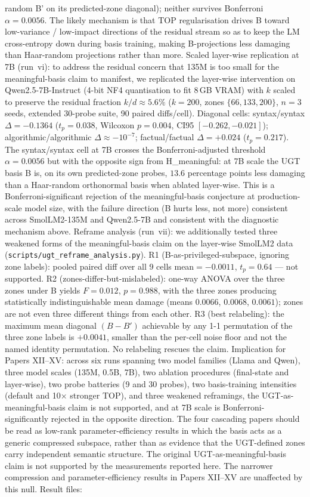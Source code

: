 \documentclass[11pt]{article}
\begin{document}
random B' on its predicted-zone diagonal); neither survives Bonferroni $\alpha{=}0.0056$. The likely mechanism is that TOP regularisation drives B toward low-variance / low-impact directions of the residual stream so as to keep the LM cross-entropy down during basis training, making B-projections less damaging than Haar-random projections rather than more. Scaled layer-wise replication at 7B (run~vi): to address the residual concern that 135M is too small for the meaningful-basis claim to manifest, we replicated the layer-wise intervention on Qwen2.5-7B-Instruct (4-bit NF4 quantisation to fit 8\,GB VRAM) with $k$ scaled to preserve the residual fraction $k/d \approx 5.6\%$ ($k{=}200$, zones $\{66,133,200\}$, $n{=}3$ seeds, extended 30-probe suite, 90 paired diffs/cell). Diagonal cells: syntax/syntax $\Delta{=}{-}0.1364$ ($t_p{=}0.038$, Wilcoxon $p{=}0.004$, CI95 $[-0.262,-0.021]$); algorithmic/algorithmic $\Delta{\approx}{-}10^{-7}$; factual/factual $\Delta{=}{+}0.024$ ($t_p{=}0.217$). The syntax/syntax cell at 7B crosses the Bonferroni-adjusted threshold $\alpha{=}0.0056$ but with the opposite sign from H\_meaningful: at 7B scale the UGT basis B is, on its own predicted-zone probes, $13.6$ percentage points less damaging than a Haar-random orthonormal basis when ablated layer-wise. This is a Bonferroni-significant rejection of the meaningful-basis conjecture at production-scale model size, with the failure direction (B hurts less, not more) consistent across SmolLM2-135M and Qwen2.5-7B and consistent with the diagnostic mechanism above. Reframe analysis (run~vii): we additionally tested three weakened forms of the meaningful-basis claim on the layer-wise SmolLM2 data (\texttt{scripts/ugt\_reframe\_analysis.py}). R1 (B-as-privileged-subspace, ignoring zone labels): pooled paired diff over all 9 cells mean${=}{-}0.0011$, $t_p{=}0.64$ — not supported. R2 (zones-differ-but-mislabeled): one-way ANOVA over the three zones under B yields $F{=}0.012$, $p{=}0.988$, with the three zones producing statistically indistinguishable mean damage (means $0.0066$, $0.0068$, $0.0061$); zones are not even three different things from each other. R3 (best relabeling): the maximum mean diagonal $(B{-}B')$ achievable by any 1-1 permutation of the three zone labels is $+0.0041$, smaller than the per-cell noise floor and not the named identity permutation. No relabeling rescues the claim. Implication for Papers XII--XV: across six runs spanning two model families (Llama and Qwen), three model scales (135M, 0.5B, 7B), two ablation procedures (final-state and layer-wise), two probe batteries (9 and 30 probes), two basis-training intensities (default and 10$\times$ stronger TOP), and three weakened reframings, the UGT-as-meaningful-basis claim is not supported, and at 7B scale is Bonferroni-significantly rejected in the opposite direction. The four cascading papers should be read as low-rank parameter-efficiency results in which the basis acts as a generic compressed subspace, rather than as evidence that the UGT-defined zones carry independent semantic structure. The original UGT-as-meaningful-basis claim is not supported by the measurements reported here. The narrower compression and parameter-efficiency results in Papers XII--XV are unaffected by this null. Result files: 
\end{document}
